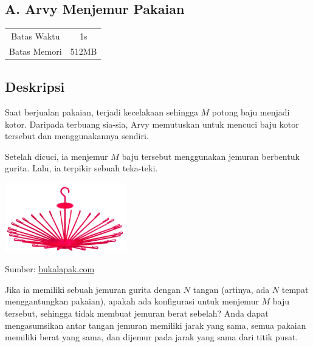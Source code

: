 \documentclass{article}
\begin{document}
\begin{center}
    \section*{A. Arvy Menjemur Pakaian}

    \begin{tabular}{ | c c | }
        \hline
        Batas Waktu  & 1s \\
        Batas Memori & 512MB \\
        \hline
    \end{tabular}
\end{center}

\subsection*{Deskripsi}

Saat berjualan pakaian, terjadi kecelakaan sehingga $M$ potong baju menjadi kotor.
Daripada terbuang sia-sia, Arvy memutuskan untuk mencuci baju kotor tersebut dan menggunakannya sendiri.

Setelah dicuci, ia menjemur $M$ baju tersebut menggunakan jemuran berbentuk gurita.
Lalu, ia terpikir sebuah teka-teki.

\begin{center}
\includegraphics[width=200px]{jemuran}

\footnotesize Sumber: \href{https://www.bukalapak.com/p/perlengkapan-bayi/perlengkapan-bayi-lainnya/9plhup-jual-jemuran-gantungan-baju-pakaian-bayi-lion-star-folding-hanger-30-sticks-besar-jemuran-gurita}{bukalapak.com}
\end{center}

Jika ia memiliki sebuah jemuran gurita dengan $N$ tangan (artinya, ada $N$ tempat menggantungkan pakaian), apakah ada konfigurasi untuk menjemur $M$ baju tersebut, sehingga tidak membuat jemuran berat sebelah?
Anda dapat mengasumsikan antar tangan jemuran memiliki jarak yang sama, semua pakaian memiliki berat yang sama, dan dijemur pada jarak yang sama dari titik pusat.
\end{document}
